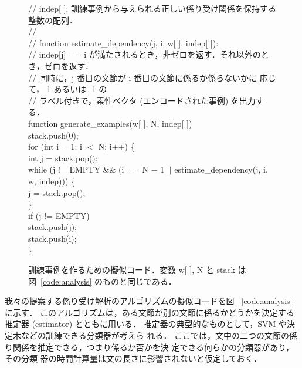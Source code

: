 \documentclass[japanese]{jnlp_1.2c}
\begin{document}
\begin{figure}[t]
// indep[ ]:  訓練事例から与えられる正しい係り受け関係を保持する整数の配列． \\ 
// \\
// function estimate\_dependency(j, i, w[ ], indep[ ]): \\
// \hspace*{1em} indep[j] == i が満たされるとき，非ゼロを返す．それ以外のとき，ゼロを返す． \\
// \hspace*{1em} 同時に，j 番目の文節が i 番目の文節に係るか係らないかに
応じて， 1 あるいは -1 の \\
// \hspace*{1em} ラベル付きで，素性ベクタ (エンコードされた事例) を出力する． \\
function generate\_examples(w[ ], N, indep[ ]) \\
stack.push(0); \\
for (int i = 1; i $<$ N; i++) \{ \\
\hspace*{1em}  int j = stack.pop(); \\
\hspace*{1em} while (j != EMPTY \&\& (i == N $-$ 1 $||$ estimate\_dependency(j, i, w, indep))) \{ \\
\hspace*{2em}    j = stack.pop(); \\
\hspace*{1em}  \} \\
\hspace*{1em}  if (j != EMPTY) \\
\hspace*{2em}    stack.push(j); \\
\hspace*{1em}  stack.push(i); \\
\}
\par\vspace{8pt}
\caption{訓練事例を作るための擬似コード．変数 w[ ],
N と stack は図~\ref{code:analysis} のものと同じである．}
\label{code:generate}
\end{figure}

我々の提案する係り受け解析のアルゴリズムの擬似コードを図
~\ref{code:analysis} に示す．
このアルゴリズムは，ある文節が別の文節に係るかどうかを決定する推定器 
(estimator) とともに用いる．
推定器の典型的なものとして，SVM や決定木などの訓練できる分類器が考えら
れる．
ここでは，文中の二つの文節の係り関係を推定できる，つまり係るか否かを決
定できる何らかの分類器があり，その分類
器の時間計算量は文の長さに影響されないと仮定しておく．
\end{document}
